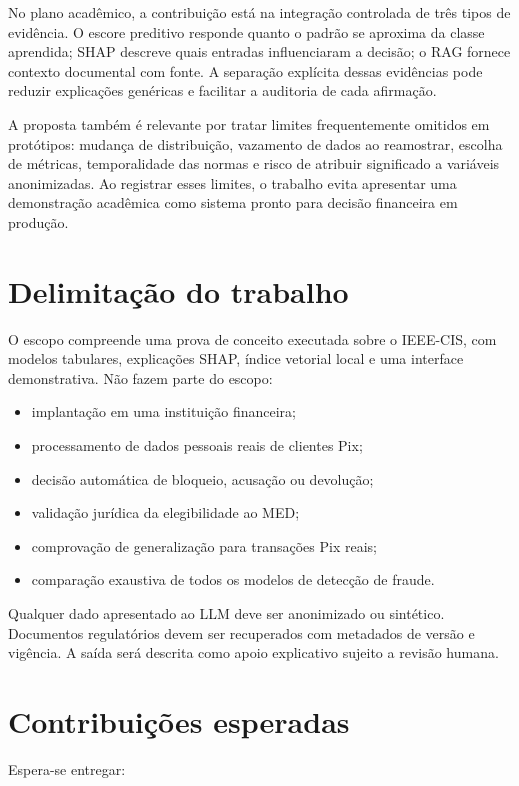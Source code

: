 No plano acadêmico, a contribuição está na integração controlada de três tipos de evidência. O escore preditivo responde quanto o padrão se aproxima da classe aprendida; SHAP descreve quais entradas influenciaram a decisão; o RAG fornece contexto documental com fonte. A separação explícita dessas evidências pode reduzir explicações genéricas e facilitar a auditoria de cada afirmação.

A proposta também é relevante por tratar limites frequentemente omitidos em protótipos: mudança de distribuição, vazamento de dados ao reamostrar, escolha de métricas, temporalidade das normas e risco de atribuir significado a variáveis anonimizadas. Ao registrar esses limites, o trabalho evita apresentar uma demonstração acadêmica como sistema pronto para decisão financeira em produção.

\section{Delimitação do trabalho}

O escopo compreende uma prova de conceito executada sobre o IEEE-CIS, com modelos tabulares, explicações SHAP, índice vetorial local e uma interface demonstrativa. Não fazem parte do escopo:

\begin{itemize}
  \item implantação em uma instituição financeira;
  \item processamento de dados pessoais reais de clientes Pix;
  \item decisão automática de bloqueio, acusação ou devolução;
  \item validação jurídica da elegibilidade ao MED;
  \item comprovação de generalização para transações Pix reais;
  \item comparação exaustiva de todos os modelos de detecção de fraude.
\end{itemize}

Qualquer dado apresentado ao LLM deve ser anonimizado ou sintético. Documentos regulatórios devem ser recuperados com metadados de versão e vigência. A saída será descrita como apoio explicativo sujeito a revisão humana.

\section{Contribuições esperadas}

Espera-se entregar:

